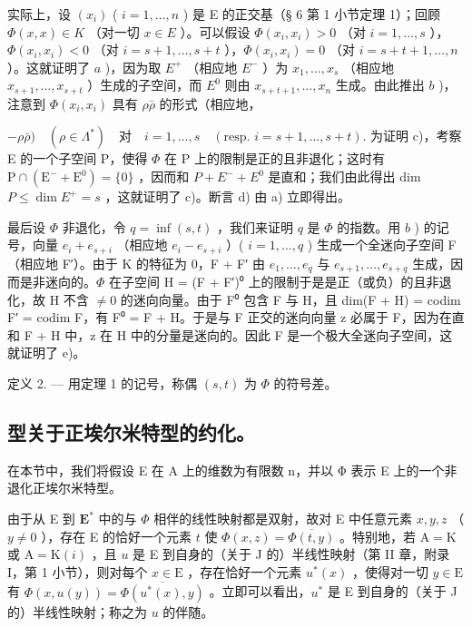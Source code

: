 实际上，设 \((x_{i})\) ( \(i = 1, \ldots, n\) ) 是 E 的正交基（§ 6 第 1 小节定理 1）；回顾 \(\Phi(x, x) \in K\) （对一切 \(x \in E\) ）。可以假设 \(\Phi(x_{i}, x_{i}) > 0\) （对 \(i = 1, \ldots, s\) ），\(\Phi(x_{i}, x_{i}) < 0\) （对 \(i = s + 1, \ldots, s + t\) ），\(\Phi(x_{i}, x_{i}) = 0\) （对 \(i = s + t + 1, \ldots, n\) ）。这就证明了 \(a\) )，因为取 \(E^{+}\) （相应地 \(E^{-}\) ）为 \(x_{1}, \ldots, x_{s}\) （相应地 \(x_{s+1}, \ldots, x_{s+t}\) ）生成的子空间，而 \(E^{0}\) 则由 \(x_{s+t+1}, \ldots, x_{n}\) 生成。由此推出 \(b\) )，注意到 \(\Phi(x_{i}, x_{i})\) 具有 \(\rho\bar{\rho}\) 的形式（相应地，

\(-\rho\bar{\rho}) \quad (\rho\in\Lambda^{*}) \quad \text{对} \quad i=1,\ldots,s \quad (\text{resp. } i=s+1,\ldots,s+t).\) 为证明 c)，考察 E 的一个子空间 P，使得 \(\Phi\) 在 P 上的限制是正的且非退化；这时有 \(\mathrm{P}\cap(\mathrm{E}^{-}+\mathrm{E}^{0})=\{0\}\) ，因而和 \(P+E^{-}+E^{0}\) 是直和；我们由此得出 dim \(P\leqslant\dim E^{+}=s\) ，这就证明了 c)。断言 d) 由 a) 立即得出。

最后设 \(\Phi\) 非退化，令 \(q = \inf (s, t)\) ，我们来证明 \(q\) 是 \(\Phi\) 的指数。用 \(b\) ) 的记号，向量 \(e_i + e_{s+i}\) （相应地 \(e_i - e_{s+i}\) ）( \(i = 1, \ldots, q\) ) 生成一个全迷向子空间 F（相应地 F′）。由于 K 的特征为 0，F + F′ 由 \(e_1, \ldots, e_q\) 与 \(e_{s+1}, \ldots, e_{s+q}\) 生成，因而是非迷向的。\(\Phi\) 在子空间 H = (F + F′)⁰ 上的限制于是是正（或负）的且非退化，故 H 不含 \(\neq 0\) 的迷向向量。由于 F⁰ 包含 F 与 H，且 dim(F + H) = codim F′ = codim F，有 F⁰ = F + H。于是与 F 正交的迷向向量 z 必属于 F，因为在直和 F + H 中，z 在 H 中的分量是迷向的。因此 F 是一个极大全迷向子空间，这就证明了 e)。

定义 2. --- 用定理 1 的记号，称偶 \((s,t)\) 为 \(\Phi\) 的符号差。

\subsection{型关于正埃尔米特型的约化。}

在本节中，我们将假设 E 在 A 上的维数为有限数 n，并以 Φ 表示 E 上的一个非退化正埃尔米特型。

由于从 E 到 \(\mathbf{E}^*\) 中的与 \(\Phi\) 相伴的线性映射都是双射，故对 E 中任意元素 \(x, y, z\) （ \(y \neq 0\) ），存在 E 的恰好一个元素 \(t\) 使 \(\Phi(x, z) = \overline{\Phi(t, y)}\) 。特别地，若 \(\mathrm{A} = \mathrm{K}\) 或 \(\mathrm{A} = \mathrm{K}(i)\) ，且 \(u\) 是 E 到自身的（关于 J 的）半线性映射（第 II 章，附录 I，第 1 小节），则对每个 \(x \in \mathrm{E}\) ，存在恰好一个元素 \(u^*(x)\) ，使得对一切 \(y \in \mathrm{E}\) 有 \(\Phi(x, u(y)) = \overline{\Phi(u^*(x), y)}\) 。立即可以看出，\(u^*\) 是 E 到自身的（关于 J 的）半线性映射；称之为 \(u\) 的伴随。

